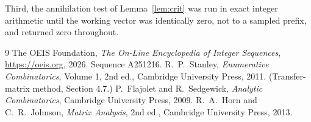 \documentclass[11pt,a4paper]{article}
\theoremstyle{plain}
\theoremstyle{definition}
\begin{document}
Third, the annihilation test of Lemma~\ref{lem:crit} was run in exact integer arithmetic
until the working vector was identically zero, not to a sampled prefix, and returned zero
throughout.

\begin{thebibliography}{9}
 The OEIS Foundation, \emph{The On-Line Encyclopedia of Integer
Sequences}, \url{https://oeis.org}, 2026. Sequence A251216.
 R.~P.~Stanley, \emph{Enumerative Combinatorics}, Volume 1, 2nd ed.,
Cambridge University Press, 2011. (Transfer-matrix method, Section 4.7.)
 P.~Flajolet and R.~Sedgewick, \emph{Analytic Combinatorics}, Cambridge
University Press, 2009.
 R.~A.~Horn and C.~R.~Johnson, \emph{Matrix Analysis}, 2nd ed., Cambridge
University Press, 2013.
\end{thebibliography}
\end{document}
